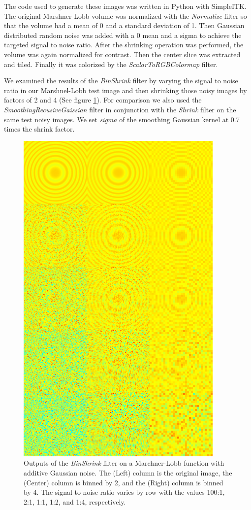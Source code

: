 \documentclass{InsightArticle}
\begin{document}
The code used to generate these images was written in Python with
SimpleITK. The original Marshner-Lobb volume was normalized with the
\textit{Normalize} filter so that the volume had a mean
of 0 and a standard deviation of 1. Then Gaussian distributed random
noise was added with a 0 mean and a sigma to achieve the targeted
signal to noise ratio. After the shrinking operation was performed,
the volume was again normalized for contrast. Then the center slice
was extracted and tiled. Finally it was colorized by the
\textit{ScalarToRGBColormap} filter\cite{Tustison2009}.

We examined the results of the \textit{BinShrink} filter by varying the
signal to noise ratio in our Marshnel-Lobb test image and then shrinking those noisy
images by factors of 2 and 4 (See figure
\ref{fig:BinShrinkComparison}). For comparison we also used the
\textit{SmoothingRecusiveGaissian} filter in conjunction with the
\textit{Shrink} filter on the same test noisy images.  We set \textit{sigma} of the
smoothing Gaussian kernel at 0.7 times the shrink factor.

\begin{figure}
  \centering
  \includegraphics[width=0.4\linewidth]{images/binshrink_hot.png}
  \caption{Outputs of the \textit{BinShrink} filter on a
    Marchner-Lobb function with additive Gaussian noise. The (Left)
    column is the original image, the (Center) column is binned
    by 2, and the (Right) column is binned by 4. The signal to
    noise ratio varies by row with the values 100:1, 2:1, 1:1, 1:2,
    and 1:4, respectively.}
  \label{fig:BinShrinkComparison}
\end{figure}
\end{document}
